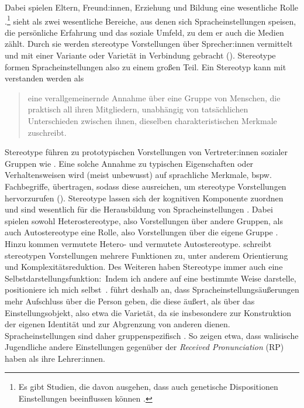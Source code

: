 Dabei spielen Eltern, Freund:innen, Erziehung und Bildung eine wesentliche Rolle \citep[s.][400]{Lasagabaster.2005}.\footnote{Es gibt Studien, die davon ausgehen, dass auch genetische Dispositionen Einstellungen beeinflussen können \citep[s.][400]{Lasagabaster.2005}.} 
\citet[22]{Garrett.2012} sieht als zwei wesentliche Bereiche, aus denen sich Spracheinstellungen speisen, die pers{\"o}nliche Erfahrung und das soziale Umfeld, zu dem er auch die Medien z{\"a}hlt.
Durch sie werden stereotype Vorstellungen {\"u}ber Sprecher:innen vermittelt und mit einer Variante oder Variet{\"a}t in Verbindung gebracht (\cites[s.][180]{Gartig2010}[180]{Plewnia.2011}[37]{Preston2004}). 
Stereotype formen Spracheinstellungen also zu einem großen Teil. 
Ein Stereotyp kann mit \citet{Aronson.2014} verstanden werden als

\begin{quote} 
\sloppy
eine verallgemeinernde Annahme über eine Gruppe von Menschen, die praktisch all ihren Mitgliedern, unabhängig von tatsächlichen Unterschieden zwischen ihnen, dieselben charakteristischen Merkmale zuschreibt. \citep[476]{Aronson.2014} 
\end{quote} 
Stereotype führen zu prototypischen Vorstellungen von Vertreter:innen sozialer Gruppen wie  \citep[s.][142]{Riehl.2000}.
Eine solche Annahme zu typischen Eigenschaften oder Verhaltensweisen wird (meist unbewusst) auf sprachliche Merkmale, bspw. Fachbegriffe, übertragen, sodass diese ausreichen, um stereotype Vorstellungen hervorzurufen (\cites[s.][81]{Hundt.1992}[38--39]{Preston2004}). 
Stereotype lassen sich der kognitiven Komponente zuordnen und sind wesentlich für die Herausbildung von Spracheinstellungen \citep[s.][201]{Jonas.2014}. 
Dabei spielen sowohl Heterostereotype, also Vorstellungen über andere Gruppen, als auch Autostereotype eine Rolle, also Vorstellungen über die eigene Gruppe \citep[s.][6--7]{Hundt.1992}. 
Hinzu kommen vermutete Hetero- und vermutete Autostereotype. 
\citet[7]{Hundt.1992} schreibt stereotypen Vorstellungen mehrere Funktionen zu, unter anderem Orientierung und Komplexitätsreduktion. 
Des Weiteren haben Stereotype immer auch eine Selbstdarstellungsfunktion:~Indem ich andere auf eine bestimmte Weise darstelle, positioniere ich mich selbst~\citep[s.][7]{Hundt.1992}. 
\citet[728]{Neuland.1993} f{\"u}hrt deshalb an, dass Spracheinstellungs{\"a}u{\ss}erungen mehr Aufschluss {\"u}ber die Person geben, die diese {\"a}u{\ss}ert, als {\"u}ber das Einstellungsobjekt, also etwa die Variet{\"a}t, da sie insbesondere zur Konstruktion der eigenen Identit{\"a}t und zur Abgrenzung von anderen dienen. 
Spracheinstellungen sind daher gruppenspezifisch \citep[s.][627]{Garrett.2001}. So zeigen \citet{Garrett.1999} etwa, dass walisische Jugendliche andere Einstellungen gegenüber der \textit{Received Pronunciation} (RP) haben als ihre Lehrer:innen. 

